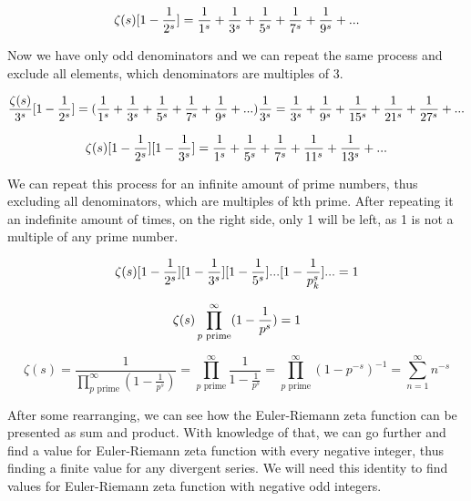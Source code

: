 \documentclass{beamer}
\begin{document}
\begin{equation*}
  \zeta(s)[1-\frac{1}{2^s}]=\frac{1}{1^s}+\frac{1}{3^s}+\frac{1}{5^s}+
  \frac{1}{7^s}+\frac{1}{9^s}+...\\
  \end{equation*}

Now we have only odd denominators and we can repeat the same process and exclude all elements, which denominators are
multiples of 3.

\begin{equation*}
  \frac{\zeta(s)}{3^s}[1-\frac{1}{2^s}] = (\frac{1}{1^s}+\frac{1}{3^s}+\frac{1}{5^s}+
  \frac{1}{7^s}+\frac{1}{9^s}+...)\frac{1}{3^s}=\frac{1}{3^s}+\frac{1}{9^s}+\frac{1}{15^s}+
  \frac{1}{21^s}+\frac{1}{27^s}+...\\
\end{equation*}

\begin{equation*}
  \zeta(s)[1-\frac{1}{2^s}][1-\frac{1}{3^s}] = \frac{1}{1^s}+\frac{1}{5^s}+\frac{1}{7^s}+
  \frac{1}{11^s}+\frac{1}{13^s}+...\\
  \end{equation*}

We can repeat this process for an infinite amount of prime numbers, thus excluding all
denominators, which are multiples of kth prime. After repeating it an indefinite amount of times,
on the right side, only 1 will be left, as 1 is not a multiple of any prime number.

\begin{equation*}
  \zeta(s)[1-\frac{1}{2^s}][1-\frac{1}{3^s}][1-\frac{1}{5^s}]...[1-\frac{1}{p_k^s}]...=1\\
  \end{equation*}

\begin{equation*}
    \zeta(s)\prod_{p \text{ prime}}^{\infty} (1-\frac{1}{p^s})=1\\
\end{equation*}

\begin{equation*}
  \zeta(s)=\frac{1}{\prod_{p \text{ prime}}^{\infty} (1-\frac{1}{p^s})}=\prod_{p \text{ prime}}^{\infty} \frac{1}{1-\frac{1}{p^s}}=
  \prod_{p \text{ prime}}^{\infty} (1-p^{-s})^{-1}=\sum_{n=1}^{\infty} n^{-s}
  \end{equation*}

After some rearranging, we can see how the Euler-Riemann zeta function can be presented as sum
and product. With knowledge of that, we can go further and find a value for Euler-Riemann zeta
function with every negative integer, thus finding a finite value for any divergent series. We will
need this identity to find values for Euler-Riemann zeta function with negative odd integers.\\
\end{document}

